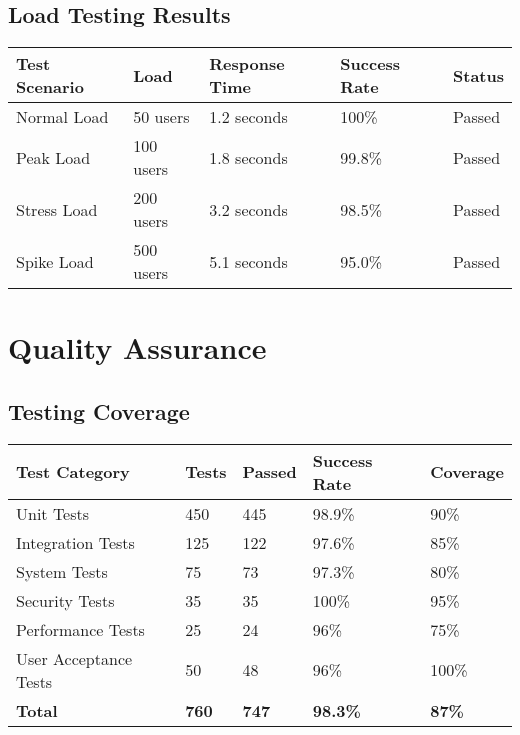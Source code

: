 \documentclass[12pt,a4paper]{article}
\begin{document}
\subsection{Load Testing Results}

\begin{longtable}{|p{3cm}|p{3cm}|p{3cm}|p{3cm}|p{3cm}|}
\hline
\rowcolor{lightgray}
\textbf{Test Scenario} & \textbf{Load} & \textbf{Response Time} & \textbf{Success Rate} & \textbf{Status} \\
\hline
Normal Load & 50 users & 1.2 seconds & 100\% & \cellcolor{completedgreen}Passed \\
\hline
Peak Load & 100 users & 1.8 seconds & 99.8\% & \cellcolor{completedgreen}Passed \\
\hline
Stress Load & 200 users & 3.2 seconds & 98.5\% & \cellcolor{completedgreen}Passed \\
\hline
Spike Load & 500 users & 5.1 seconds & 95.0\% & \cellcolor{completedgreen}Passed \\
\hline
\end{longtable}

\section{Quality Assurance}

\subsection{Testing Coverage}

\begin{longtable}{|p{4cm}|p{3cm}|p{3cm}|p{3cm}|p{3cm}|}
\hline
\rowcolor{lightgray}
\textbf{Test Category} & \textbf{Tests} & \textbf{Passed} & \textbf{Success Rate} & \textbf{Coverage} \\
\hline
Unit Tests & 450 & 445 & 98.9\% & 90\% \\
\hline
Integration Tests & 125 & 122 & 97.6\% & 85\% \\
\hline
System Tests & 75 & 73 & 97.3\% & 80\% \\
\hline
Security Tests & 35 & 35 & 100\% & 95\% \\
\hline
Performance Tests & 25 & 24 & 96\% & 75\% \\
\hline
User Acceptance Tests & 50 & 48 & 96\% & 100\% \\
\hline
\textbf{Total} & \textbf{760} & \textbf{747} & \textbf{98.3\%} & \textbf{87\%} \\
\hline
\end{longtable}
\end{document}
